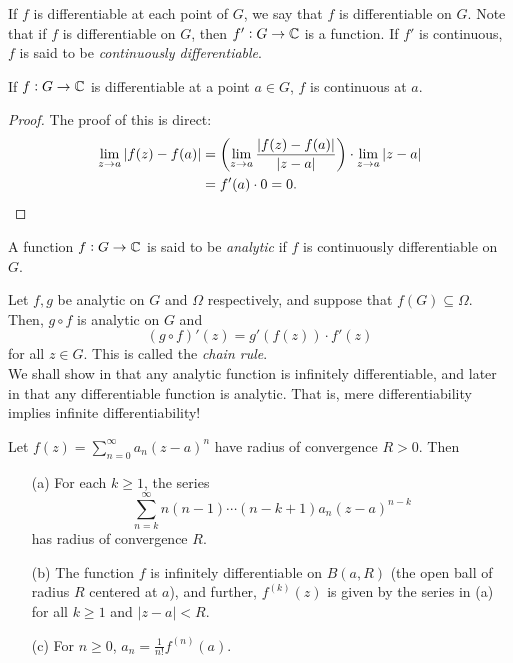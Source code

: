 	If $f$ is differentiable at each point of $G$, we say that $f$ is differentiable on $G$. Note that if $f$ is differentiable on $G$, then $f' : G \to \mathbb{C}$ is a function. If $f'$ is continuous, $f$ is said to be \emph{continuously differentiable}.

	\begin{theorem}
		If $f : G \to \mathbb{C}$ is differentiable at a point $a \in G$, $f$ is continuous at $a$.
	\end{theorem}
	\begin{proof}
		The proof of this is direct:
		\begin{align*}
			\lim_{z \to a} |f(z) - f(a)| &= \left( \lim_{z \to a} \frac{|f(z)-f(a)|}{|z-a|} \right) \cdot \lim_{z\to a} |z-a| \\
				&= f'(a) \cdot 0 = 0. \qedhere
		\end{align*}
	\end{proof}

	\begin{fdef}
		A function $f : G \to \mathbb{C}$ is said to be \emph{analytic} if $f$ is continuously differentiable on $G$.
	\end{fdef}

	Let $f,g$ be analytic on $G$ and $\Omega$ respectively, and suppose that $f(G) \subseteq \Omega$. Then, $g \circ f$ is analytic on $G$ and
	\[ (g \circ f)'(z) = g'(f(z)) \cdot f'(z) \]
	for all $z \in G$. This is called the \emph{chain rule}.\\

	We shall show in  that any analytic function is infinitely differentiable, and later in  that any differentiable function is analytic. That is, mere differentiability implies infinite differentiability!

	\begin{ftheo}
		\label{theo: power series rad conv}
		Let $f(z) = \sum_{n=0}^\infty a_n (z-a)^n$ have radius of convergence $R > 0$. Then
		\begin{itemize}
			\item[(a)] For each $k \ge 1$, the series
			\[ \sum_{n=k}^\infty n(n-1)\cdots(n-k+1) a_n (z-a)^{n-k} \]
			has radius of convergence $R$.

			\item[(b)] The function $f$ is infinitely differentiable on $B(a,R)$ (the open ball of radius $R$ centered at $a$), and further, $f^{(k)}(z)$ is given by the series in (a) for all $k \ge 1$ and $|z-a| < R$.

			\item[(c)] For $n \ge 0$, $a_n = \frac{1}{n!} f^{(n)}(a)$. 
		\end{itemize}
	\end{ftheo}

